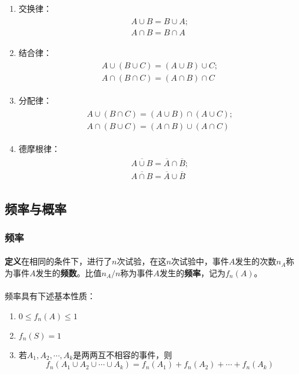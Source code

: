 \begin{enumerate}
  \item 交换律：
  \begin{align}
    \begin{split}
    A \cup B = B \cup A; \\
    A \cap B = B \cap A
    \end{split}
  \end{align}
  \item 结合律：
  \begin{align}
    \begin{split}
    A \cup (B \cup C) = (A \cup B) \cup C; \\
    A \cap (B \cap C) = (A \cap B) \cap C
    \end{split}
  \end{align}
  \item 分配律：
  \begin{align}
    \begin{split}
    A \cup (B \cap C) = (A \cup B) \cap (A \cup C); \\
    A \cap (B \cup C) = (A \cap B) \cup (A \cap C)
    \end{split}
  \end{align}
  \item 德摩根律：
  \begin{align}
    \begin{split}
    \overline{A \cup B} = \overline{A} \cap \overline{B}; \\
    \overline{A \cap B} = \overline{A} \cup \overline{B}
    \end{split}
  \end{align}
\end{enumerate}

\subsection{频率与概率}
\subsubsection{频率}
\paragraph{}
\textbf{定义\;}在相同的条件下，进行了$n$次试验，在这$n$次试验中，事件$A$发生的次数$n_A$称为事件$A$发生的\textbf{频数}。比值$n_A / n$称为事件$A$发生的\textbf{频率}，记为$f_n(A)$。

\paragraph{}
频率具有下述基本性质：
\begin{enumerate}
  \item $0 \leq f_n(A) \leq 1$
  \item $f_n (S) = 1$
  \item 若$A_1, A_2, \cdots, A_k$是两两互不相容的事件，则
  \begin{equation}
    f_n(A_1 \cup A_2 \cup \cdots \cup A_k) = f_n(A_1) + f_n(A_2) + \cdots + f_n(A_k)
  \end{equation}
\end{enumerate}

